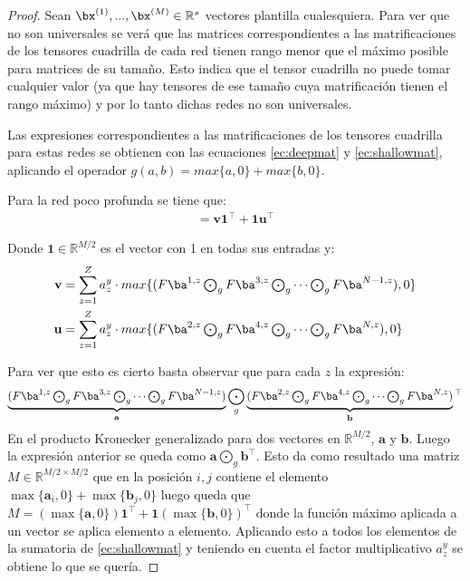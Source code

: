 \begin{proof}
Sean $\bx^{(1)},... ,\bx^{(M)}\in\mathbb{R}^s$ vectores plantilla cualesquiera. Para ver que no son universales se verá que las matrices correspondientes a las matrificaciones de los tensores cuadrilla de cada red tienen rango menor que el máximo posible para matrices de su tamaño. Esto indica que el tensor cuadrilla no puede tomar cualquier valor (ya que hay tensores de ese tamaño cuya matrificación tienen el rango máximo) y por lo tanto dichas redes no son universales.

Las expresiones correspondientes a las matrificaciones de los tensores cuadrilla para estas redes se obtienen con las ecuaciones \eqref{ec:deepmat} y \eqref{ec:shallowmat}, aplicando el operador $g(a,b) = max\{a,0\} + max\{b,0\}$.

Para la red poco profunda se tiene que:
\begin{align*}
[\mathcal{A}(h_y^S)]= \mathbf{v1}^\top + \mathbf{1u}^\top
\end{align*}

Donde $\mathbf{1}\in\mathbb{R}^{M/2}$ es el vector con 1 en todas sus entradas y:
\begin{align*}
\mathbf{v} &= \sum_{z=1}^{Z}a^y_z \cdot max\{(F\ba^{1,z}\textstyle  \bigodot_g F\ba^{3,z} \bigodot_g \cdots  \bigodot_g F\ba^{N-1,z}),0\}\\
\mathbf{u} &= \sum_{z=1}^{Z}a^y_z \cdot max\{(F\ba^{2,z}\textstyle  \bigodot_g F\ba^{4,z} \bigodot_g \cdots  \bigodot_g F\ba^{N,z}),0\}
\end{align*}

Para ver que esto es cierto basta observar que para cada $z$ la expresión:
\begin{align*}
\underbrace{(F\ba^{1,z}\textstyle  \bigodot_g F\ba^{3,z} \bigodot_g \cdots  \bigodot_g F\ba^{N-1,z})}_{\mathbf{a}}\bigodot_g \underbrace{(F\ba^{2,z}\textstyle  \bigodot_g F\ba^{4,z} \bigodot_g \cdots  \bigodot_g F\ba^{N,z})}_{\mathbf{b}}\hspace{0cm}^\top
\end{align*}
En el producto Kronecker generalizado para dos vectores en $\mathbb{R}^{M/2}$, $\mathbf{a}$ y $\mathbf{b}$. Luego la expresión anterior se queda como $\mathbf{a}\bigodot_g\mathbf{b}^\top$. Esto da como resultado una matriz $M\in\mathbb{R}^{M/2 \times M/2}$ que en la posición $i,j$ contiene el elemento $\max\{\mathbf{a}_i,0\} + \max\{\mathbf{b}_j,0\}$ luego queda que $M = (\max\{\mathbf{a},0\})\mathbf{1}^\top + \mathbf{1}(\max\{\mathbf{b},0\})^\top$ donde la función máximo aplicada a un vector se aplica elemento a elemento. Aplicando esto a todos los elementos de la sumatoria de \eqref{ec:shallowmat} y teniendo en cuenta el factor multiplicativo $a_z^y$ se obtiene lo que se quería.


\end{proof}
